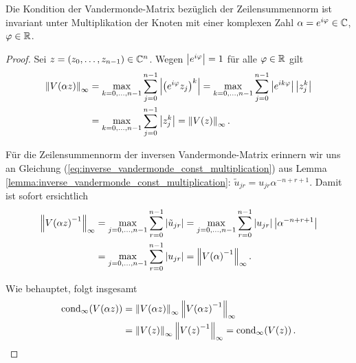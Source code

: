\begin{lemma}
    \label{lemma:vandermonde_rotation_invariance}
    Die Kondition der Vandermonde-Matrix bezüglich der Zeilensummennorm ist
    invariant unter Multiplikation der Knoten mit einer komplexen Zahl
    $\alpha = e^{i\varphi} \in \mathbb{C}$, $\varphi \in \mathbb{R}$.
\end{lemma}
\begin{proof}
    Sei $z = (z_0, \dots, z_{n-1}) \in \mathbb{C}^n$.
    Wegen $\left\lvert e^{i\varphi} \right\rvert = 1$ für alle $\varphi \in \mathbb{R}$ gilt
    \[
        \begin{split}
            \left\lVert V \! \left( \alpha z \right) \right\rVert_\infty
            &= \max_{k=0, \dots, n-1} \sum_{j=0}^{n-1} \left\lvert \left(e^{i\varphi} z_j\right)^k \right\rvert
            = \max_{k=0, \dots, n-1} \sum_{j=0}^{n-1} \left\lvert e^{ik\varphi} \right\rvert \left\lvert z_j^k \right\rvert\\
            &= \max_{k=0, \dots, n-1} \sum_{j=0}^{n-1} \left\lvert z_j^k \right\rvert
            = \left\lVert V \! \left( z \right) \right\rVert_\infty.
        \end{split}
    \]

    \noindent Für die Zeilensummennorm der inversen Vandermonde-Matrix erinnern wir uns an Gleichung
    (\ref{eq:inverse_vandermonde_const_multiplication})
    aus Lemma \ref{lemma:inverse_vandermonde_const_multiplication}:
    $\tilde{u}_{jr} = u_{jr} \alpha^{-n+r+1}$.
    Damit ist sofort ersichtlich
    \[
        \begin{split}
            \left\lVert V \! \left( \alpha z \right)^{-1} \right\rVert_\infty
            &= \max_{j=0, \dots, n-1} \sum_{r=0}^{n-1} \left\lvert \tilde{u}_{jr} \right\rvert
            = \max_{j=0, \dots, n-1} \sum_{r=0}^{n-1} \left\lvert u_{jr} \right\rvert \left\lvert \alpha^{-n+r+1} \right\rvert\\
            &= \max_{j=0, \dots, n-1} \sum_{r=0}^{n-1} \left\lvert u_{jr} \right\rvert
            = \left\lVert V \! \left( \alpha \right)^{-1} \right\rVert_\infty.
        \end{split}
    \]

    \noindent Wie behauptet, folgt insgesamt
    \[
        \begin{split}
            \cond[\infty]{\Vand{\alpha z}}
            &= \norm{\Vand{\alpha z}}_\infty \norm{\Vand{\alpha z}^{-1}}_\infty\\
            &= \norm{\Vand{z}}_\infty \norm{\Vand{z}^{-1}}_\infty
            = \cond[\infty]{\Vand{z}}.
        \end{split}
    \]
\end{proof}

